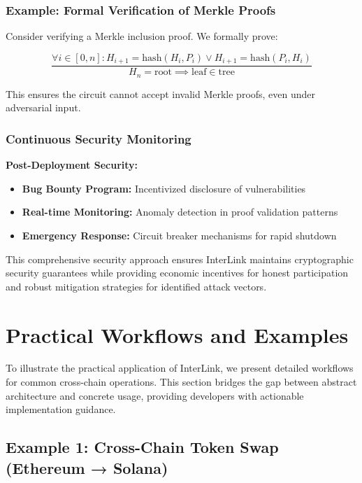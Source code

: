 \documentclass[11pt,a4paper]{article}
\begin{document}
\subsubsection{Example: Formal Verification of Merkle Proofs}

Consider verifying a Merkle inclusion proof. We formally prove:

\[
\frac{\forall i \in [0, n]: H_{i+1} = \text{hash}(H_i, P_i) \lor H_{i+1} = \text{hash}(P_i, H_i)}{H_n = \text{root} \implies \text{leaf} \in \text{tree}}
\]

This ensures the circuit cannot accept invalid Merkle proofs, even under adversarial input.

\subsubsection{Continuous Security Monitoring}

\textbf{Post-Deployment Security:}
\begin{itemize}
    \item \textbf{Bug Bounty Program:} Incentivized disclosure of vulnerabilities
    \item \textbf{Real-time Monitoring:} Anomaly detection in proof validation patterns
    \item \textbf{Emergency Response:} Circuit breaker mechanisms for rapid shutdown
\end{itemize}

This comprehensive security approach ensures InterLink maintains cryptographic security guarantees while providing economic incentives for honest participation and robust mitigation strategies for identified attack vectors.

\section{Practical Workflows and Examples}
\label{sec:workflows}

To illustrate the practical application of InterLink, we present detailed workflows for common cross-chain operations. This section bridges the gap between abstract architecture and concrete usage, providing developers with actionable implementation guidance.

\subsection{Example 1: Cross-Chain Token Swap (Ethereum → Solana)}
\end{document}
